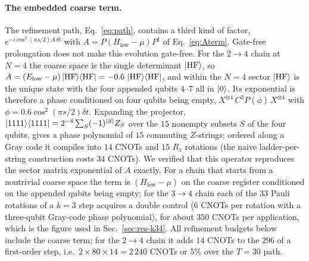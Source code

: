 \documentclass[
  aps,            %
  prc,            %
  reprint,        %
  superscriptaddress,
  floatfix,
  nofootinbib
]{revtex4-2}
\newcommand{\Hlow}{H_{\mathrm{low}}}
\begin{document}
\paragraph{The embedded coarse term.}
The refinement path, Eq.~\eqref{eq:path}, contains a third kind of factor,
$e^{-i\cos^2(\pi s/2)A\,\delta t}$ with $A=P(\Hlow-\mu)P^\dagger$ of
Eq.~\eqref{eq:Aterm}.  Gate-free prolongation does not make this evolution
gate-free.  For the $2\to4$ chain at $N=4$ the coarse space is the single
determinant $\ket{\rm HF}$, so $A=(E_{\rm low}-\mu)\ket{\rm HF}\!\bra{\rm HF}
=-0.6\,\ket{\rm HF}\!\bra{\rm HF}$, and within the $N=4$ sector $\ket{\rm HF}$ is
the unique state with the four appended qubits $4$--$7$ all in $\ket0$.  Its
exponential is therefore a phase conditioned on four qubits being empty,
$X^{\otimes4}\,C^{3}P(\phi)\,X^{\otimes4}$ with $\phi=0.6\cos^2(\pi s/2)\delta t$.
Expanding the projector, $\ket{1111}\!\bra{1111}=2^{-4}\sum_{S}(-1)^{|S|}Z_S$
over the $15$ nonempty subsets $S$ of the four qubits, gives a phase polynomial
of $15$ commuting $Z$-strings; ordered along a Gray code it compiles into
$14$ CNOTs and $15$ $R_z$ rotations (the naive ladder-per-string construction
costs $34$ CNOTs).  We verified that this operator reproduces the sector
matrix exponential of $A$ exactly.  For a chain that starts from a nontrivial
coarse space the term is $(\Hlow-\mu)$ on the coarse register conditioned on
the appended qubits being empty; for the $3\to4$ chain each of the $33$ Pauli
rotations of a $k=3$ step acquires a double control ($6$ CNOTs per rotation
with a three-qubit Gray-code phase polynomial), for about $350$ CNOTs per
application, which is the figure used in Sec.~\ref{sec:res-k34}.  All
refinement budgets below include the coarse term; for the $2\to4$ chain it
adds $14$ CNOTs to the $296$ of a first-order step, i.e.\ $2\times80\times14
=2\,240$ CNOTs or $5\%$ over the $T=30$ path.
\end{document}
